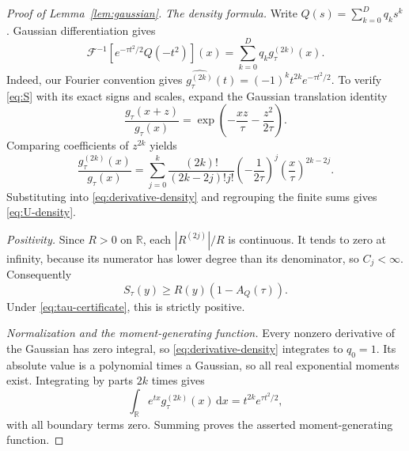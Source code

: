 \documentclass[11pt,twoside]{article}
\theoremstyle{journalplain}
\numberwithin{equation}{section}
\theoremstyle{journaldefinition}
\newcommand{\R}{\mathbb R}
\newcommand{\dd}{\,\mathrm d}
\begin{document}
\begin{proof}[Proof of Lemma~\ref{lem:gaussian}]
\emph{The density formula.} Write $Q(s)=\sum_{k=0}^Dq_ks^k$. Gaussian differentiation gives
\begin{equation}\label{eq:derivative-density}
 \mathcal F^{-1}[e^{-\tau t^2/2}Q(-t^2)](x)
 =\sum_{k=0}^D q_k g_\tau^{(2k)}(x).
\end{equation}
Indeed, our Fourier convention gives $\widehat{g_\tau^{(2k)}}(t)=(-1)^kt^{2k}e^{-\tau t^2/2}$. To verify \eqref{eq:S} with its exact signs and scales, expand the Gaussian translation identity
\[
 \frac{g_\tau(x+z)}{g_\tau(x)}
 =\exp\left(-\frac{xz}{\tau}-\frac{z^2}{2\tau}\right).
\]
Comparing coefficients of $z^{2k}$ yields
\[
 \frac{g_\tau^{(2k)}(x)}{g_\tau(x)}
 =\sum_{j=0}^k\frac{(2k)!}{(2k-2j)!j!}
 \left(-\frac1{2\tau}\right)^j\left(\frac{x}{\tau}\right)^{2k-2j}.
\]
Substituting into \eqref{eq:derivative-density} and regrouping the finite sums gives \eqref{eq:U-density}.

\emph{Positivity.} Since $R>0$ on $\R$, each $|R^{(2j)}|/R$ is continuous. It tends to zero at infinity, because its numerator has lower degree than its denominator, so $C_j<\infty$. Consequently
\[
 S_\tau(y)\ge R(y)(1-A_Q(\tau)).
\]
Under \eqref{eq:tau-certificate}, this is strictly positive.

\emph{Normalization and the moment-generating function.} Every nonzero derivative of the Gaussian has zero integral, so \eqref{eq:derivative-density} integrates to $q_0=1$. Its absolute value is a polynomial times a Gaussian, so all real exponential moments exist. Integrating by parts $2k$ times gives
\[
 \int_\R e^{tx}g_\tau^{(2k)}(x)\dd x=t^{2k}e^{\tau t^2/2},
\]
with all boundary terms zero. Summing proves the asserted moment-generating function.
\end{proof}
\end{document}
